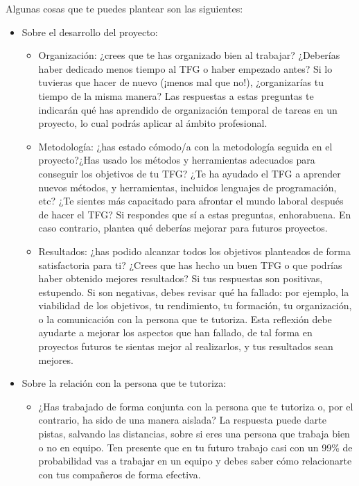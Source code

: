 Algunas cosas que te puedes plantear son las siguientes:

\begin{itemize}
    \item Sobre el desarrollo del proyecto:
        \begin{itemize}
            \item Organización: ¿crees que te has organizado bien al trabajar? ¿Deberías haber dedicado menos tiempo al TFG o haber empezado antes? Si lo tuvieras que hacer de nuevo (¡menos mal que no!), ¿organizarías tu tiempo de la misma manera? Las respuestas a estas preguntas te indicarán qué has aprendido de organización temporal de tareas en un proyecto, lo cual podrás aplicar al ámbito profesional.
            \item Metodología: ¿has estado cómodo/a con la metodología seguida en el proyecto?¿Has usado los métodos y herramientas adecuados para conseguir los objetivos de tu TFG? ¿Te ha ayudado el TFG a aprender nuevos métodos, y herramientas, incluidos lenguajes de programación, etc? ¿Te sientes más capacitado para afrontar el mundo laboral después de hacer el TFG? Si respondes que sí a estas preguntas, enhorabuena. En caso contrario, plantea qué deberías mejorar para futuros proyectos.
            \item Resultados: ¿has podido alcanzar todos los objetivos planteados de forma satisfactoria para ti? ¿Crees que has hecho un buen TFG o que podrías haber obtenido mejores resultados? Si tus respuestas son positivas, estupendo. Si son negativas, debes revisar qué ha fallado: por ejemplo, la viabilidad de los objetivos, tu rendimiento, tu formación, tu organización, o la comunicación con la persona que te tutoriza. Esta reflexión debe ayudarte a mejorar los aspectos que han fallado, de tal forma en proyectos futuros te sientas mejor al realizarlos, y tus resultados sean mejores.
        \end{itemize}
    \item Sobre la relación con la persona que te tutoriza:
        \begin{itemize}
            \item ¿Has trabajado de forma conjunta con la persona que te tutoriza o, por el contrario, ha sido de una manera aislada? La respuesta puede darte pistas, salvando las distancias, sobre si eres una persona que trabaja bien o no en equipo. Ten presente que en tu futuro trabajo casi con un 99\% de probabilidad vas a trabajar en un equipo y debes saber cómo relacionarte con tus compañeros de forma efectiva. 

\end{itemize}
\end{itemize}

